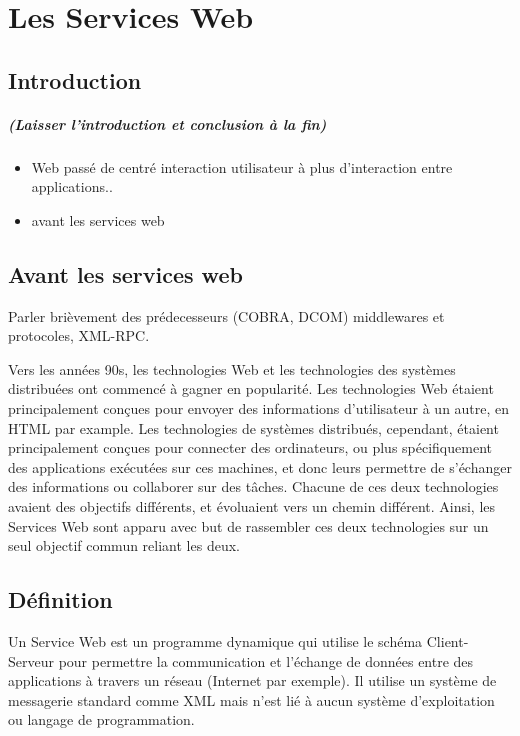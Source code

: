 \chapter{Les Services Web}
\newpage
\section{Introduction} 
\paragraph{(Laisser l'introduction et conclusion à la fin)}
\begin{itemize}
	\item Web passé de centré interaction utilisateur à plus d'interaction entre applications..
	\item avant les services web
\end{itemize}
		
\section{Avant les services web}
Parler brièvement des prédecesseurs (COBRA, DCOM) middlewares et protocoles, XML-RPC.\newline
		
Vers les années 90s, les technologies Web et les technologies des systèmes distribuées ont commencé à gagner en popularité. Les technologies Web étaient principalement conçues pour envoyer des informations d'utilisateur à un autre, en HTML par example. Les technologies de systèmes distribués, cependant, étaient principalement conçues pour connecter des ordinateurs, ou plus spécifiquement des applications exécutées sur ces machines, et donc leurs permettre de s'échanger des informations ou collaborer sur des tâches.
Chacune de ces deux technologies avaient des objectifs différents, et évoluaient vers un chemin différent. Ainsi, les Services Web sont apparu avec but de rassembler ces deux technologies sur un seul objectif commun reliant les deux.\cite{W3Road}

\section{Définition}
Un Service Web est un programme dynamique qui utilise le schéma Client-Serveur pour permettre la communication et l'échange de données entre des applications à travers un réseau (Internet par exemple).
Il utilise un système de messagerie standard comme XML mais n'est lié à aucun système d'exploitation ou langage de programmation.

